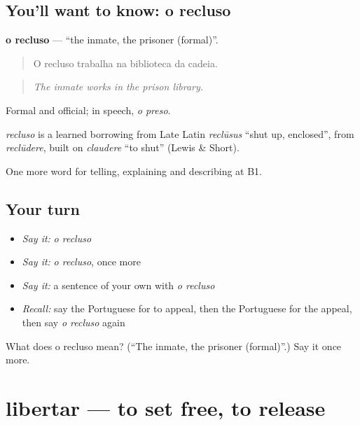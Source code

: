 \subsection*{You'll want to know: o recluso}
\textbf{o recluso} — \textquotedblleft{}the inmate, the prisoner (formal)\textquotedblright{}.

\begin{quote}
O recluso trabalha na biblioteca da cadeia.
\end{quote}

\begin{quote}
\emph{The inmate works in the prison library.}
\end{quote}

Formal and official; in speech, \emph{o preso}.

\begin{cousinweb}
\emph{recluso} is a learned borrowing from Late Latin \emph{reclūsus} \textquotedblleft{}shut up, enclosed\textquotedblright{}, from \emph{reclūdere}, built on \emph{claudere} \textquotedblleft{}to shut\textquotedblright{} (Lewis \& Short).
\end{cousinweb}

\begin{grammarlens}[title={What you've built}]
One more word for telling, explaining and describing at B1.
\end{grammarlens}

\subsection*{Your turn}
\begin{itemize}
\raggedright
  \item \emph{Say it:} \emph{o recluso}
  \item \emph{Say it:} \emph{o recluso}, once more
  \item \emph{Say it:} a sentence of your own with \emph{o recluso}
  \item \emph{Recall:} say the Portuguese for to appeal, then the Portuguese for the appeal, then say \emph{o recluso} again
\end{itemize}

\begin{tcolorbox}[breakable,colback=teal!4,colframe=teal!35!black,title={Before you move on}]
What does o recluso mean? (\textquotedblleft{}The inmate, the prisoner (formal)\textquotedblright{}.) Say it once more.
\end{tcolorbox}
\section[libertar]{libertar — to set free, to release}

